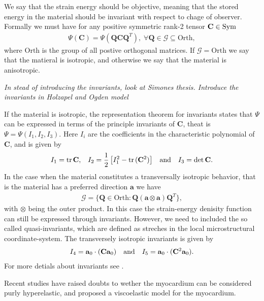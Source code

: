 We say that the strain energy should be objective, meaning that the
stored energy in the material should be invariant with respect to
chage of observer. Formally we must have for any positive symmetric
rank-2 tensor $\mathbf{C} \in \mathrm{Sym}$ 
\begin{align}
  \Psi(\mathbf{C}) = \Psi(\mathbf{Q}\mathbf{C}\mathbf{Q}^T), \; \forall \mathbf{Q} \in \mathcal{G} \subseteq \mathrm{Orth},
\end{align}
where $\mathrm{Orth}$ is the group of all postive orthogonal matrices.
If $\mathcal{G} = \mathrm{Orth}$ we say that the matieral is
isotropic, and otherwise we say that the material is anisotropic.

\emph{In stead of introducing the invariants, look at Simones
  thesis. Introduce the invariants in Holzapel and Ogden model}


If the material is isotropic, the representation theorem for
invariants states that $\Psi$ can be expressed in terms of the principle
invariants of $\mathbf{C}$, theat is $\Psi = \Psi(I_1, I_2, I_3)$.
Here $I_i$ are the coefficients in the characteristic polynomial of
$\mathbf{C}$, and is given by 
\begin{align}
  I_1 = \mathrm{tr} \hspace{0.05cm} \mathbf{C},  && I_2 = \frac{1}{2}\left[ I_1^2 - \mathrm{tr} \hspace{0.05cm}(\mathbf{C}^2)\right] && \text{and} && I_3 = \det \mathbf{C}.
\end{align}
In the case when the material constitutes a transversally isotropic
behavior, that is the material has a preferred direction $\mathbf{a}$
we have
\begin{align*}
  \mathcal{G} = \{ \mathbf{Q} \in \mathrm{Orth}: \mathbf{Q}(\mathbf{a}\otimes\mathbf{a})\mathbf{Q}^T\},
\end{align*}
with $\otimes$ being the outer product. In this case the strain-energy
denisity function can still be expressed through invariants. However,
we need to included the so called quasi-invariants, which are defined
as streches in the local microstructural coordinate-system. The
transversely isotropic invariants is given by
\begin{align}
  I_4 = \mathbf{a}_0 \cdot (\mathbf{C} \mathbf{a}_0) && \text{and} && I_5 = \mathbf{a}_0 \cdot (\mathbf{C}^2 \mathbf{a}_0).
\end{align}
For more detials about invariants see \cite{holzapfel2009constitutive,liu1982representations}.


Recent studies \cite{gultekin2016orthotropic} have raised doubts to
wether the myocardium can be considered purly hyperelastic, and
proposed a viscoelastic model for the myocardium. 

